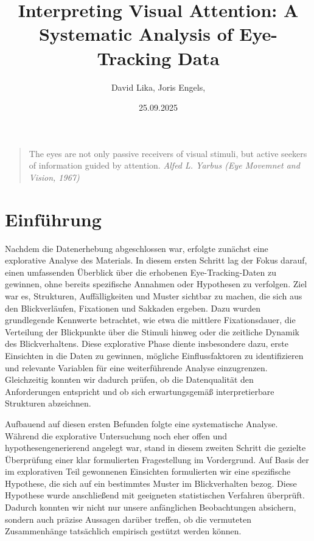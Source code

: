 \documentclass[
    language=german, %
    thesis=seminar, %
    supervisor=postdoc, %
    multiauthor=true, %
    ]{settings/csssa-thesis}
\title{Interpreting Visual Attention: A Systematic Analysis of Eye-Tracking Data}
\author{David Lika, Joris Engels,}
\date{25.09.2025}
\begin{document}
\maketitlepage
\maketitle

\begin{quote}
    The eyes are not only passive receivers of visual stimuli, but active seekers of information guided by attention.
    {\textit{Alfed L. Yarbus (Eye Movemnet and Vision, 1967)}}
\end{quote}

\begin{abstract}
    \lipsum[1]
\end{abstract}

\section{Einführung}

Nachdem die Datenerhebung abgeschlossen war, erfolgte zunächst eine explorative Analyse des Materials.
In diesem ersten Schritt lag der Fokus darauf, einen umfassenden Überblick über die erhobenen Eye-Tracking-Daten zu gewinnen,
ohne bereits spezifische Annahmen oder Hypothesen zu verfolgen. 
Ziel war es, Strukturen, Auffälligkeiten und Muster sichtbar zu machen, die sich aus den Blickverläufen,
Fixationen und Sakkaden ergeben. Dazu wurden grundlegende Kennwerte betrachtet, wie etwa die mittlere Fixationsdauer,
die Verteilung der Blickpunkte über die Stimuli hinweg oder die zeitliche Dynamik des Blickverhaltens.
Diese explorative Phase diente insbesondere dazu, erste Einsichten in die Daten zu gewinnen,
mögliche Einflussfaktoren zu identifizieren und relevante Variablen für eine weiterführende Analyse einzugrenzen.
Gleichzeitig konnten wir dadurch prüfen, ob die Datenqualität den Anforderungen entspricht und ob sich erwartungsgemäß
interpretierbare Strukturen abzeichnen. 

Aufbauend auf diesen ersten Befunden folgte eine systematische Analyse.
Während die explorative Untersuchung noch eher offen und hypothesengenerierend angelegt war,
stand in diesem zweiten Schritt die gezielte Überprüfung einer klar formulierten Fragestellung im Vordergrund.
Auf Basis der im explorativen Teil gewonnenen Einsichten formulierten wir eine spezifische Hypothese,
die sich auf ein bestimmtes Muster im Blickverhalten bezog. Diese Hypothese wurde anschließend mit geeigneten
statistischen Verfahren überprüft. Dadurch konnten wir nicht nur unsere anfänglichen Beobachtungen absichern,
sondern auch präzise Aussagen darüber treffen, ob die vermuteten Zusammenhänge tatsächlich empirisch gestützt werden können. 
\end{document}
